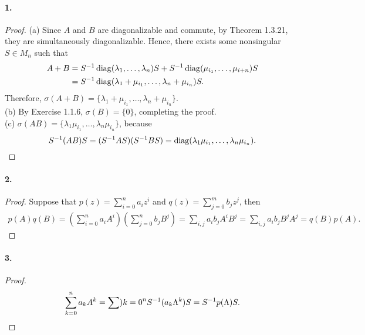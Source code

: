   \paragraph{1.}
  \begin{proof}
    (a) Since $A$ and $B$ are diagonalizable and commute, by Theorem 1.3.21, 
    they are simultaneously diagonalizable. Hence, there exists some nonsingular
    $S\in M_n$ such that
    \begin{align*}
      A+B &=
      S^{-1}\operatorname{diag}(\lambda_1,\dots,\lambda_n)S 
      + S^{-1}\operatorname{diag}(\mu_{i_1},\dots,\mu_{i+n }) S \\
      &= S^{-1}\operatorname{diag}(\lambda_1+\mu_{i_1},\dots, \lambda_n+\mu_{i_n})S.
    \end{align*}
    Therefore, $\sigma(A+B)=\{\lambda_1+\mu_{i_1},\dots, \lambda_n+\mu_{i_n}\}$.
    \\ (b) By Exercise 1.1.6, $\sigma(B)=\{0\}$, completing the proof. \\
    (c) $\sigma(AB) = \{\lambda_1\mu_{i_1},\dots,\lambda_n\mu_{i_n}\}$, because
    \[
      S^{-1}(AB)S = (S^{-1} AS)(S^{-1} BS) = 
      \operatorname{diag}(\lambda_1\mu_{i_1},\dots,\lambda_n\mu_{i_n}).
    \]
  \end{proof}

  \paragraph{2.}
  \begin{proof}
    Suppose that $p(z)=\sum_{i=0}^n a_iz^i$ and $q(z)=\sum_{j=0}^m b_jz^j$, then
    \begin{align*}
      p(A)q(B) 
      = \left(\sum_{i=0}^n a_iA^i\right)\left(\sum_{j=0}^n b_jB^j\right)
      = \sum_{i,j}a_ib_jA^iB^j
      = \sum_{i,j}a_ib_jB^jA^j
      = q(B)p(A).
    \end{align*}
      
  \end{proof}

  \paragraph{3.}
  \begin{proof}
    \[
      \sum_{k=0}^n a_k A^k = \sum){k=0}^n S^{-1} (a_k\Lambda^k)S
      = S^{-1} p(\Lambda)S.
    \]
  \end{proof}

